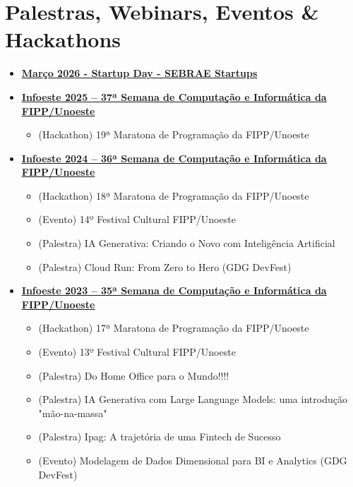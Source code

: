 \documentclass[letterpaper,11pt]{article}
\begin{document}
\section{Palestras, Webinars, Eventos \& Hackathons}
\begin{itemize}[leftmargin=0.15in, label={}]

    \item \small \textbf{\href{https://raw.githubusercontent.com/elvitin/curriculo/main/certs/sebrae-startupday/certificado_startupday_marco_2026.pdf}{\underline{Março 2026 - Startup Day - SEBRAE Startups}}}
    
    
    \item \small \textbf{\href{https://raw.githubusercontent.com/elvitin/curriculo/main/certs/infoeste/Certificado2025.pdf}{\underline{Infoeste 2025 -- 37ª Semana de Computação e Informática da FIPP/Unoeste}}}
    \begin{itemize}[itemsep=-5pt, parsep=3pt]
        \item\small (Hackathon) 19ª Maratona de Programação da FIPP/Unoeste
    \end{itemize}

    \item \small \textbf{\href{https://raw.githubusercontent.com/elvitin/curriculo/main/certs/infoeste/Certificado2024.pdf}{\underline{Infoeste 2024 -- 36ª Semana de Computação e Informática da FIPP/Unoeste}}}
    \begin{itemize}[itemsep=-5pt, parsep=3pt]
        \item\small (Hackathon) 18ª Maratona de Programação da FIPP/Unoeste
        \item\small (Evento) 14º Festival Cultural FIPP/Unoeste
        \item\small (Palestra) IA Generativa: Criando o Novo com Inteligência Artificial
        \item\small (Palestra) Cloud Run: From Zero to Hero (GDG DevFest)
    \end{itemize}

    \item \small \textbf{\href{https://raw.githubusercontent.com/elvitin/curriculo/main/certs/infoeste/Certificado2023.pdf}{\underline{Infoeste 2023 -- 35ª Semana de Computação e Informática da FIPP/Unoeste}}}
    \begin{itemize}[itemsep=-5pt, parsep=3pt]
        \item\small (Hackathon) 17ª Maratona de Programação da FIPP/Unoeste
        \item\small (Evento) 13º Festival Cultural FIPP/Unoeste
        \item\small (Palestra) Do Home Office para o Mundo!!!!
        \item\small (Palestra) IA Generativa com Large Language Models: uma introdução "mão-na-massa"
        \item\small (Palestra) Ipag: A trajetória de uma Fintech de Sucesso
        \item\small (Evento) Modelagem de Dados Dimensional para BI e Analytics (GDG DevFest)
    \end{itemize}


\end{itemize}
\end{document}
